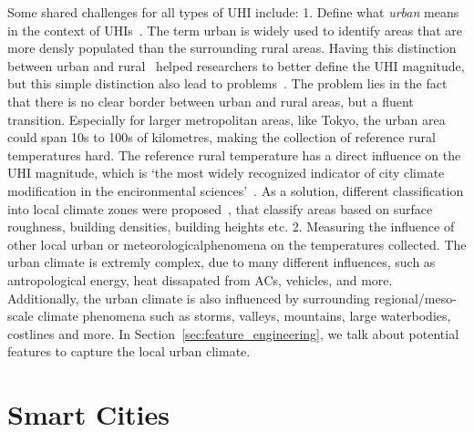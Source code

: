 Some shared challenges for all types of UHI include: 1. Define what \textit{urban} means in the context of UHIs~\cite{stewart2009newly}. The term urban is widely used to identify areas that are more densly populated than the surrounding rural areas. Having this distinction between urban and rural~\cite{lowry1977empirical} helped researchers to better define the UHI magnitude, but this simple distinction also lead to problems~\cite{stewart2011systematic}. The problem lies in the fact that there is no clear border between urban and rural areas, but a fluent transition. Especially for larger metropolitan areas, like Tokyo, the urban area could span 10s to 100s of kilometres, making the collection of reference rural temperatures hard. The reference rural temperature has a direct influence on the UHI magnitude, which is `the most widely recognized indicator of city climate modification in the encironmental sciences'~\cite{stewart2009newly}. As a solution, different classification into local climate zones were proposed~\cite{stewart2012local, stewart2009newly}, that classify areas based on surface roughness, building densities, building heights etc. 2. Measuring the influence of other local urban or meteorologicalphenomena on the temperatures collected. The urban climate is extremly complex, due to many different influences, such as antropological energy, heat dissapated from ACs, vehicles, and more. Additionally, the urban climate is also influenced by surrounding regional/meso-scale climate phenomena such as storms, valleys, mountains, large waterbodies, costlines and more. In Section~\ref{sec:feature_engineering}, we talk about potential features to capture the local urban climate.

\section{Smart Cities}

